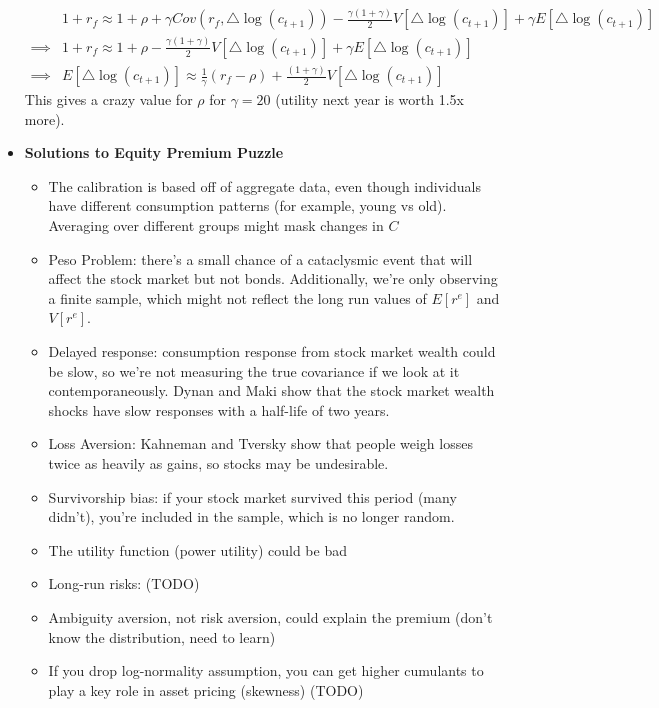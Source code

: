 \documentclass[12pt]{article}
\begin{document}
\begin{itemize}
    \[\begin{split}
        &1+r_f \approx 1+\rho + \gamma Cov(r_f, \triangle \log(c_{t+1})) - \frac{\gamma(1+\gamma)}{2}V[\triangle \log(c_{t+1})] + \gamma E[\triangle \log(c_{t+1})] \\
        \implies &1+r_f \approx 1+\rho - \frac{\gamma(1+\gamma)}{2}V[\triangle \log(c_{t+1})] + \gamma E[\triangle \log(c_{t+1})] \\
        \implies &E[\triangle \log(c_{t+1})] \approx \frac{1}{\gamma}(r_f - \rho) + \frac{(1+\gamma)}{2}V[\triangle \log(c_{t+1})]
    \end{split}\]
    This gives a crazy value for $\rho$ for $\gamma = 20$ (utility next year is worth 1.5x more).
    \item \textbf{Solutions to Equity Premium Puzzle}
    \begin{itemize}
        \item The calibration is based off of aggregate data, even though individuals have different consumption patterns (for example, young vs old). Averaging over different groups might mask changes in $C$
        \item Peso Problem: there's a small chance of a cataclysmic event that will affect the stock market but not bonds. Additionally, we're only observing a finite sample, which might not reflect the long run values of $E[r^e]$ and $V[r^e]$. 
        \item Delayed response: consumption response from stock market wealth could be slow, so we're not measuring the true covariance if we look at it contemporaneously. Dynan and Maki show that the stock market wealth shocks have slow responses with a half-life of two years.
        \item Loss Aversion: Kahneman and Tversky show that people weigh losses twice as heavily as gains, so stocks may be undesirable.
        \item Survivorship bias: if your stock market survived this period (many didn't), you're included in the sample, which is no longer random.
        \item The utility function (power utility) could be bad
        \item Long-run risks: (TODO)
        \item Ambiguity aversion, not risk aversion, could explain the premium (don't know the distribution, need to learn)
        \item If you drop log-normality assumption, you can get higher cumulants to play a key role in asset pricing (skewness) (TODO)
    \end{itemize}
\end{itemize}
\end{document}
